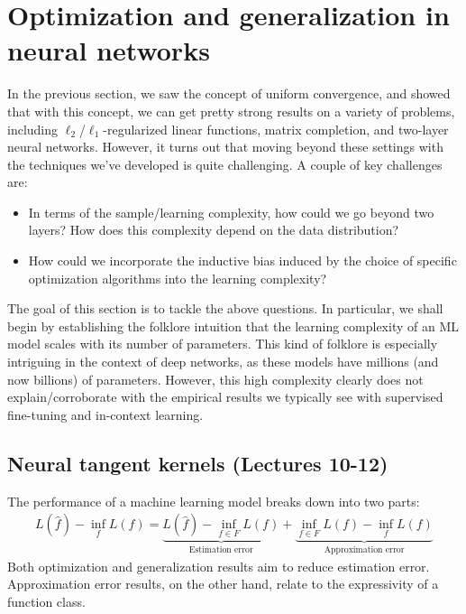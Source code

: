 \section{Optimization and generalization in neural networks}

In the previous section, we saw the concept of uniform convergence, and showed that with this concept, we can get pretty strong results on a variety of problems, including $\ell_2$/$\ell_1$-regularized linear functions, matrix completion, and two-layer neural networks.
However, it turns out that moving beyond these settings with the techniques we've developed is quite challenging.
A couple of key challenges are:
\begin{itemize}
    \item In terms of the sample/learning complexity, how could we go beyond two layers? How does this complexity depend on the data distribution?

    \item How could we incorporate the inductive bias induced by the choice of specific optimization algorithms into the learning complexity?
\end{itemize}
The goal of this section is to tackle the above questions.
In particular, we shall begin by establishing the folklore intuition that the learning complexity of an ML model scales with its number of parameters.
This kind of folklore is especially intriguing in the context of deep networks, as these models have millions (and now billions) of parameters.
However, this high complexity clearly does not explain/corroborate with the empirical results we typically see with supervised fine-tuning and in-context learning.

\subsection{Neural tangent kernels (Lectures 10-12)}

The performance of a machine learning model breaks down into two parts:
\begin{align*}
    L(\hat f) - \inf_f L(f) = \underbrace{L(\hat f) - \inf_{f\in F} L(f)}_{\text{Estimation error}} + \underbrace{\inf_{f\in F} L(f) - \inf_{f} L(f)}_{\text{Approximation error}}
\end{align*}
Both optimization and generalization results aim to reduce estimation error.
Approximation error results, on the other hand, relate to the expressivity of a function class.

